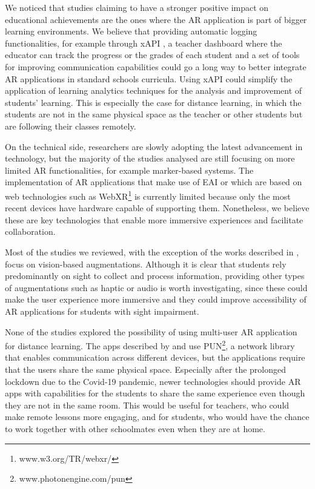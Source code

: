 We noticed that studies claiming to have a stronger positive impact on educational achievements are the ones where the \gls{AR} application is part of bigger learning environments. We believe that providing automatic logging functionalities, for example through xAPI \cite{kevan2016experience}, a teacher dashboard where the educator can track the progress or the grades of each student and a set of tools for improving communication capabilities could go a long way to better integrate \gls{AR} applications in standard schools curricula. Using xAPI could simplify the application of learning analytics techniques for the analysis and improvement of students' learning. This is especially the case for distance learning, in which the students are not in the same physical space as the teacher or other students but are following their classes remotely.

On the technical side, researchers are slowly adopting the latest advancement in technology, but the majority of the studies analysed are still focusing on more limited \gls{AR} functionalities, for example marker-based systems. The implementation of \gls{AR} applications that make use of \gls{EAI} or which are based on web technologies such as WebXR\footnote{www.w3.org/TR/webxr/} is currently limited because only the most recent devices have hardware capable of supporting them. Nonetheless, we believe these are key technologies that enable more immersive experiences and facilitate collaboration. 

Most of the studies we reviewed, with the exception of the works described in \cite{chen2018application, kenoui2020teach, mikulowski2020multi}, focus on vision-based augmentations. Although it is clear that students rely predominantly on sight to collect and process information, providing other types of augmentations such as haptic or audio is worth investigating, since these could make the user experience more immersive and they could improve accessibility of \gls{AR} applications for students with sight impairment.

None of the studies explored the possibility of using multi-user AR application for distance learning. The apps described by \cite{oh2017hybrid} and \cite{lopez2020emofindar} use PUN\footnote{www.photonengine.com/pun}, a network library that enables communication across different devices, but the applications require that the users share the same physical space. Especially after the prolonged lockdown due to the Covid-19 pandemic, newer technologies should provide AR apps with capabilities for the students to share the same experience even though they are not in the same room. This would be useful for teachers, who could make remote lessons more engaging, and for students, who would have the chance to work together with other schoolmates even when they are at home.  

